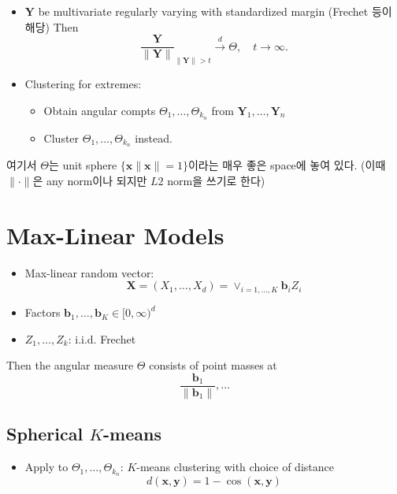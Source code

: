 \documentclass[
  13pt,
  letterpaper,
  DIV=11,
  numbers=noendperiod]{scrreprt}
\providecommand{\tightlist}{%
  \setlength{\itemsep}{0pt}\setlength{\parskip}{0pt}}\usepackage{longtable,booktabs,array}
\theoremstyle{definition}
\theoremstyle{plain}
\theoremstyle{definition}
\theoremstyle{plain}
\theoremstyle{plain}
\theoremstyle{definition}
\theoremstyle{remark}
\begin{document}
\begin{itemize}
\item
  \(\pmb{Y}\) be multivariate regularly varying with standardized margin
  (Frechet 등이 해당) Then \[
  \frac{\pmb{Y}}{\|\pmb{Y}\|}_{\| \pmb{Y}\|>t}\stackrel{d}{\rightarrow} \Theta, \quad{} t \rightarrow \infty.
  \]
\item
  Clustering for extremes:

  \begin{itemize}
  \tightlist
  \item
    Obtain angular compts \(\Theta_1, \ldots, \Theta_{k_n}\) from
    \(\pmb{Y}_1, \ldots , \pmb{Y}_n\)
  \item
    Cluster \(\Theta_1, \ldots, \Theta_{k_n}\) instead.
  \end{itemize}
\end{itemize}

여기서 \(\Theta\)는 unit sphere \(\{ \pmb{x} \| \pmb{x} \| = 1\}\)이라는
매우 좋은 space에 놓여 있다. (이때 \(\| \cdot \|\)은 any norm이나 되지만
\(L2\) norm을 쓰기로 한다)

\section{Max-Linear Models}\label{max-linear-models}

\begin{itemize}
\item
  Max-linear random vector: \[
  \pmb{X} = (X_1, \ldots, X_d) = \vee_{i=1, \ldots, K}\pmb{b}_i Z_i
  \]
\item
  Factors \(\pmb{b}_1, \ldots, \pmb{b}_{K} \in [ 0, \infty )^{d}\)
\item
  \(Z_1, \ldots, Z_k\): i.i.d. Frechet
\end{itemize}

Then the angular measure \(\Theta\) consists of point masses at \[
\frac{\pmb{b}_1}{\|\pmb{b}_1\|}, \ldots
\]

\subsection{\texorpdfstring{Spherical
\(K\)-means}{Spherical K-means}}\label{spherical-k-means}

\begin{itemize}
\tightlist
\item
  Apply to \(\Theta_1, \ldots, \Theta_{k_n}\): \(K\)-means clustering
  with choice of distance \[
  d(\pmb{x}, \pmb{y}) = 1- \cos (\pmb{x}, \pmb{y})
  \]
\end{itemize}
\end{document}
